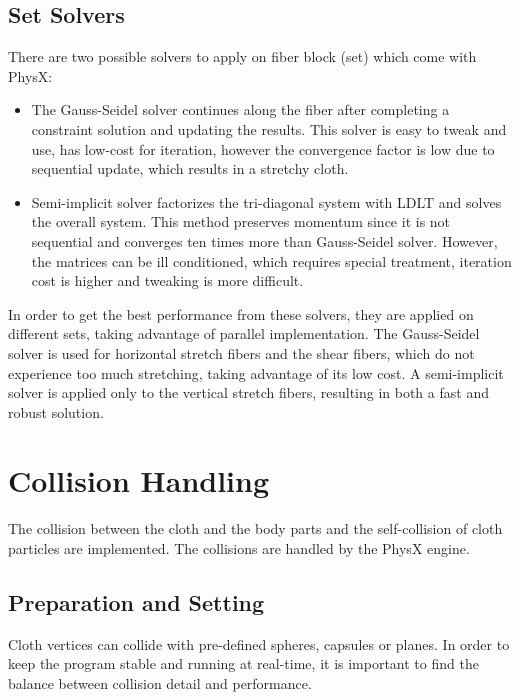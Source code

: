 \subsection{Set Solvers}
There are two possible solvers to apply on fiber block (set) which come with PhysX:
\begin{itemize}
\item The Gauss-Seidel solver continues along the fiber after completing a constraint solution and updating the results. This solver is easy to tweak and use, has low-cost for iteration, however the convergence factor is low due to sequential update, which results in a stretchy cloth.
\item Semi-implicit solver factorizes the tri-diagonal system with LDLT and solves the overall system. This method preserves momentum since it is not sequential and converges ten times more than Gauss-Seidel solver. However, the matrices can be ill conditioned, which requires special treatment, iteration cost is higher and tweaking is more difficult.
\end{itemize}

In order to get the best performance from these solvers, they are applied on different sets, taking advantage of parallel implementation. The Gauss-Seidel solver is used for horizontal stretch fibers and the shear fibers, which do not experience too much stretching, taking advantage of its low cost. A semi-implicit solver is applied only to the vertical stretch fibers, resulting in both a fast and robust solution.

\section{Collision Handling}
\label{section_chapter_collision}

The collision between the cloth and the body parts and the self-collision of cloth particles are implemented. The collisions are handled by the PhysX engine. 

\subsection{Preparation and Setting}
\label{section_collision_preparation}

Cloth vertices can collide with pre-defined spheres, capsules or planes. In order to keep the program stable and running at real-time, it is important to find the balance between collision detail and performance. 

